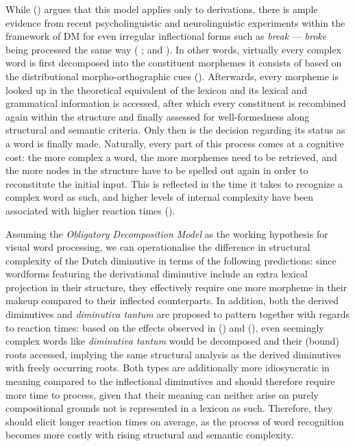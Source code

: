 While \citeauthor{Taft+2004} (\citeyear{Taft+2004}) argues that this model applies only to derivations, there is ample evidence from recent psycholinguistic and neurolinguistic experiments within the framework of DM for even irregular inflectional forms such as \textit{break} --- \textit{broke} being processed the same way (\citeauthor{Stockall+Marantz2006} \citeyear{Stockall+Marantz2006}; \citeauthor{Fruchter+etal+2013} \citeyear{Fruchter+etal+2013} and \citeauthor{Fruchter+Marantz+2015} \citeyear{Fruchter+Marantz+2015}). In other words, virtually every complex word is first decomposed into the constituent morphemes it consists of based on the distributional morpho-orthographic cues (\cite{Rastle+etal+2004}). Afterwards, every morpheme is looked up in the theoretical equivalent of the lexicon and its lexical and grammatical information is accessed, after which every constituent is recombined again within the structure and finally assessed for well-formedness along structural and semantic criteria. Only then is the decision regarding its status as a word is finally made. Naturally, every part of this process comes at a cognitive cost: the more complex a word, the more morphemes need to be retrieved, and the more nodes in the structure have to be spelled out again in order to reconstitute the initial input. This is reflected in the time it takes to recognize a complex word as such, and higher levels of internal complexity have been associated with higher reaction times (\cite{Stockall+Marantz2006}).

Assuming the \textit{Obligatory Decomposition Model} as the working hypothesis for visual word processing, we can operationalise the difference in structural complexity of the Dutch diminutive in terms of the following predictions: since wordforms featuring the derivational diminutive include an extra lexical projection in their structure, they effectively require one more morpheme in their makeup compared to their inflected counterparts. In addition, both the derived diminutives and \textit{diminutiva tantum} are proposed to pattern together with regards to reaction times: based on the effects observed in \citeauthor{Taft+1979} (\citeyear{Taft+1979}) and \citeauthor{Rastle+etal+2004} (\citeyear{Rastle+etal+2004}), even seemingly complex words like \textit{diminutiva tantum} would be decomposed and their (bound) roots accessed, implying the same structural analysis as the derived diminutives with freely occurring roots. Both types are additionally more idiosyncratic in meaning compared to the inflectional diminutives and should therefore require more time to process, given that their meaning can neither arise on purely compositional grounds not is represented in a lexicon as such. Therefore, they should elicit longer reaction times on average, as the process of word recognition becomes more costly with rising structural and semantic complexity.